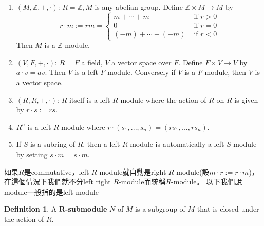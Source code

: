 \documentclass[12pt]{article}
\theoremstyle{definition}
\newtheorem{dfn}{Definition}
\newcommand{\ZZ}{\mathbb Z}
\begin{document}
\begin{ex}
	\begin{enumerate}
		\item $(M,\ZZ,+,\cdot)$: $R = \ZZ, M$ is any abelian group.
		      Define $\ZZ \times M \to M$ by
		      \[r \cdot m := rm =\begin{cases*} m + \cdots + m       & \text{ if } r > 0 \\
               0                    & \text{ if } r = 0 \\
               (-m) + \cdots + (-m) & \text{ if } r < 0\end{cases*}\]
		      Then $M$ is a $\ZZ$-module.

		\item $(V,F,+, \cdot)$: $R = F$ a field, $V$ a vector space over $F$.
		      Define $F \times V \to V$ by $a \cdot v = av$.
		      Then $V$ is a left $F$-module.
		      Conversely if $V$ is a $F$-module, then $V$ is a vector space.
		\item $(R,R,+,\cdot)$: $R$ itself is a left $R$-module where the action of $R$ on $R$ is given by $r \cdot s := rs$.
		\item $R^n$ is a left $R$-module where $r \cdot (s_1, ..., s_n) = (r s_1, ..., r s_n)$.
		\item If $S$ is a subring of $R$, then a left $R$-module is automatically a left $S$-module by setting $s \cdot m = s \cdot m$.
	\end{enumerate}
\end{ex}

如果$R$是commutative，left $R$-module就自動是right $R$-module(設$m \cdot r := r \cdot m$)，在這個情況下我們就不分left right $R$-module而統稱$R$-module。
以下我們說module一般指的是left module

\begin{dfn}
	A \textbf{$\bm{R}$-submodule} $N$ of $M$ is a subgroup of $M$ that is closed under the action of $R$.
\end{dfn}
\end{document}
